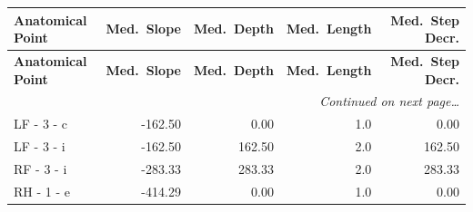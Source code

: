 \documentclass[a4paper,11pt]{article}
\begin{document}
\begin{small}
\begin{longtable}{p{4.5cm}rrrr}
\toprule
\textbf{Anatomical Point} &
\textbf{Med.\ Slope} &
\textbf{Med.\ Depth} &
\textbf{Med.\ Length} &
\textbf{Med.\ Step Decr.} \\
\midrule
\endfirsthead
\toprule
\textbf{Anatomical Point} &
\textbf{Med.\ Slope} &
\textbf{Med.\ Depth} &
\textbf{Med.\ Length} &
\textbf{Med.\ Step Decr.} \\
\midrule
\endhead
\midrule
\multicolumn{5}{r}{\small\emph{Continued on next page\ldots}} \\
\endfoot
\bottomrule
\endlastfoot
LF - 3 - c & -162.50 & 0.00 & 1.0 & 0.00 \\
LF - 3 - i & -162.50 & 162.50 & 2.0 & 162.50 \\
RF - 3 - i & -283.33 & 283.33 & 2.0 & 283.33 \\
RH - 1 - e & -414.29 & 0.00 & 1.0 & 0.00 \\
\end{longtable}
\end{small}
\end{document}
